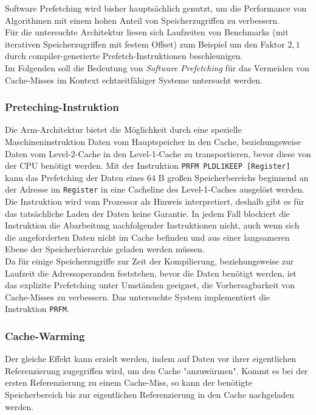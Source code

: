 \documentclass[]{scrbook}
\begin{document}
Software Prefetching wird bisher hauptsächlich genutzt, um die Performance von Algorithmen mit einem hohen Anteil von Speicherzugriffen zu verbessern.\\
Für die untersuchte Architektur liesen sich Laufzeiten von Benchmarks (mit iterativen Speicherzugriffen mit festem Offset) zum Beispiel um den Faktor $2,1$ durch compiler-generierte Prefetch-Instruktionen beschleunigen. \cite{prefetch}\\
Im Folgenden soll die Bedeutung von \textsl{Software Prefetching} für das Vermeiden von Cache-Misses im Kontext echtzeitfähiger Systeme untersucht werden.

\subsubsection{Preteching-Instruktion}
Die Arm-Architektur bietet die Möglichkeit durch eine spezielle Maschineninstruktion Daten vom Hauptspeicher in den Cache, beziehungsweise Daten vom Level-2-Cache in den Level-1-Cache zu transportieren, bevor diese von der CPU benötigt werden.
Mit der Instruktion \texttt{PRFM PLDL1KEEP [Register]} kann das Prefetching der Daten eines $64 \textrm{ B}$ großen Speicherbereichs beginnend an der Adresse im \texttt{Register} in eine Cacheline des Level-1-Caches ausgelöst werden.
\\
Die Instruktion wird vom Prozessor als Hinweis interpretiert, deshalb gibt es für das tatsächliche Laden der Daten keine Garantie. \cite{armPG_1}
In jedem Fall blockiert die Instruktion die Abarbeitung nachfolgender Instruktionen nicht, auch wenn sich die angeforderten Daten nicht im Cache befinden und aus einer langsameren Ebene der Speicherhierarchie geladen werden müssen.
\\
Da für einige Speicherzugriffe zur Zeit der Kompilierung, beziehungsweise zur Laufzeit die Adressoperanden feststehen, bevor die Daten benötigt werden, ist das explizite Prefetching unter Umständen geeignet, die Vorhersagbarkeit von Cache-Misses zu verbessern. 
Das untersuchte System implementiert die Instruktion \texttt{PRFM}.

\subsubsection{Cache-Warming}
Der gleiche Effekt kann erzielt werden, indem auf Daten vor ihrer eigentlichen Referenzierung zugegriffen wird, um den Cache "anzuwärmen". 
Kommt es bei der ersten Referenzierung zu einem Cache-Miss, so kann der benötigte Speicherbereich bis zur eigentlichen Referenzierung in den Cache nachgeladen werden.
\end{document}
